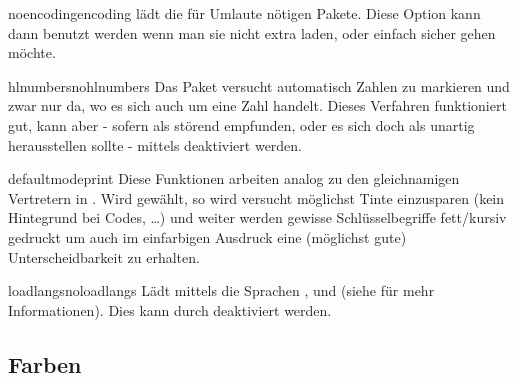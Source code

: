 \documentclass{sopra-base}
\begin{document}
    \begin{argument}{noencoding}{encoding}
        \label{mrk:encoding} lädt die für Umlaute nötigen Pakete. Diese Option kann dann benutzt werden wenn man sie nicht extra laden, oder einfach sicher gehen möchte.
    \end{argument}

    \begin{argument}{hlnumbers}{nohlnumbers}
        Das Paket versucht automatisch Zahlen zu markieren und zwar nur da, wo es sich auch um eine Zahl handelt. Dieses Verfahren funktioniert gut, kann aber - sofern als störend empfunden, oder es sich doch als unartig herausstellen sollte - mittels  deaktiviert werden.
    \end{argument}


    \begin{argument}{defaultmode}{print}
        Diese Funktionen arbeiten analog zu den gleichnamigen Vertretern in . Wird  gewählt, so wird versucht möglichst Tinte einzusparen (kein Hintegrund bei Codes, \ldots) und weiter werden gewisse
        Schlüsselbegriffe fett/kursiv gedruckt um auch im einfarbigen Ausdruck eine 
        (möglichst gute) Unterscheidbarkeit zu erhalten.
    \end{argument}

    \begin{argument}{loadlangs}{noloadlangs}
        Lädt mittels  die Sprachen ,  und  (siehe  für mehr Informationen). Dies kann durch  deaktiviert werden. 
    \end{argument}

\subsection{Farben}
\end{document}
